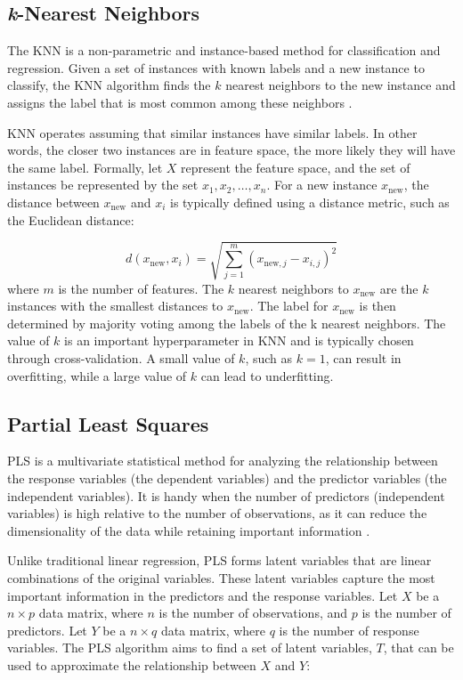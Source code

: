 \subsection{\textit{k}-Nearest Neighbors}
The \ac{KNN} is a non-parametric and instance-based method for classification and regression. Given a set of instances with known labels and a new instance to classify, the \ac{KNN} algorithm finds the $k$ nearest neighbors to the new instance and assigns the label that is most common among these neighbors \cite{altman1992Introduction}.

\ac{KNN} operates assuming that similar instances have similar labels. In other words, the closer two instances are in feature space, the more likely they will have the same label. Formally, let $ X$ represent the feature space, and the set of instances be represented by the set $x_1, x_2,\ldots, x_n$. For a new instance $x_{\text{new}}$, the distance between $x_{\text{new}}$ and $x_i$ is typically defined using a distance metric, such as the Euclidean distance:

\begin{equation}
    d\left(x_{\text{new}}, x_i\right) = \sqrt{\displaystyle \sum_{j=1}^m (x_{\text{new},j} - x_{i,j})^2}
\end{equation}
where $m$ is the number of features. The $k$ nearest neighbors to $x_{\text{new}}$ are the $k$ instances with the smallest distances to $x_{\text{new}}$. The label for $x_{\text{new}}$ is then determined by majority voting among the labels of the k nearest neighbors. The value of $k$ is an important hyperparameter in \ac{KNN} and is typically chosen through cross-validation. A small value of $k$, such as $k=1$, can result in overfitting, while a large value of $k$ can lead to underfitting.

\subsection{Partial Least Squares}
\ac{PLS} is a multivariate statistical method for analyzing the relationship between the response variables (the dependent variables) and the predictor variables (the independent variables). It is handy when the number of predictors (independent variables) is high relative to the number of observations, as it can reduce the dimensionality of the data while retaining important information \cite{wold1983Multivariate}.

Unlike traditional linear regression, \ac{PLS} forms latent variables that are linear combinations of the original variables. These latent variables capture the most important information in the predictors and the response variables. Let $X$ be a $n \times p$ data matrix, where $n$ is the number of observations, and $p$ is the number of predictors. Let $Y$ be a $n \times q$ data matrix, where $q$ is the number of response variables. The \ac{PLS} algorithm aims to find a set of latent variables, $T$, that can be used to approximate the relationship between $X$ and $Y$:

